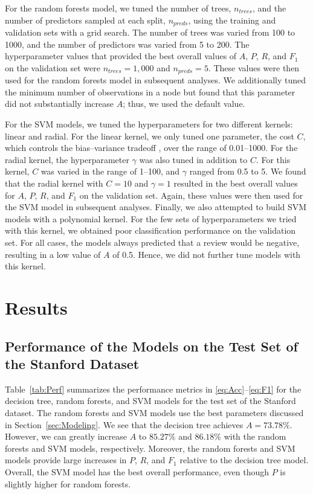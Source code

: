 \documentclass[conference]{IEEEtran}
\begin{document}
For the random forests model, we tuned the number of trees, \(n_{trees}\), and the number of predictors sampled at each split, \(n_{preds}\), using the training and validation sets with a grid search. The number of trees was varied from 100 to 1000, and the number of predictors was varied from 5 to 200. The hyperparameter values that provided the best overall values of \(A\), \(P\), \(R\), and \(F_1\) on the validation set were \(n_{trees} = 1,000\) and \(n_{preds} = 5\). These values were then used for the random forests model in subsequent analyses. We additionally tuned the minimum number of observations in a node but found that this parameter did not substantially increase \(A\); thus, we used the default value.

For the SVM models, we tuned the hyperparameters for two different kernels: linear and radial. For the linear kernel, we only tuned one parameter, the cost \(C\), which controls the bias--variance tradeoff \cite{ref:ISLR}, over the range of 0.01--1000. For the radial kernel, the hyperparameter \(\gamma\) was also tuned in addition to \(C\). For this kernel, \(C\) was varied in the range of 1--100, and \(\gamma\) ranged from 0.5 to 5. We found that the radial kernel with \(C = 10\) and \(\gamma = 1\) resulted in the best overall values for \(A\), \(P\), \(R\), and \(F_1\) on the validation set. Again, these values were then used for the SVM model in subsequent analyses. Finally, we also attempted to build SVM models with a polynomial kernel. For the few sets of hyperparameters we tried with this kernel, we obtained poor classification performance on the validation set. For all cases, the models always predicted that a review would be negative, resulting in a low value of \(A\) of 0.5. Hence, we did not further tune models with this kernel.

\section{Results}\label{sec:Results}
\subsection{Performance of the Models on the Test Set of the Stanford Dataset}\label{sec:Perf_Stanford}
Table~\ref{tab:Perf} summarizes the performance metrics in \eqref{eq:Acc}--\eqref{eq:F1} for the decision tree, random forests, and SVM models for the test set of the Stanford dataset. The random forests and SVM models use the best parameters discussed in Section~\ref{sec:Modeling}. We see that the decision tree achieves \(A = 73.78\%\). However, we can greatly increase \(A\) to \(85.27\%\) and \(86.18\%\) with the random forests and SVM models, respectively. Moreover, the random forests and SVM models provide large increases in \(P\), \(R\), and \(F_1\) relative to the decision tree model. Overall, the SVM model has the best overall performance, even though \(P\) is slightly higher for random forests.
\end{document}
